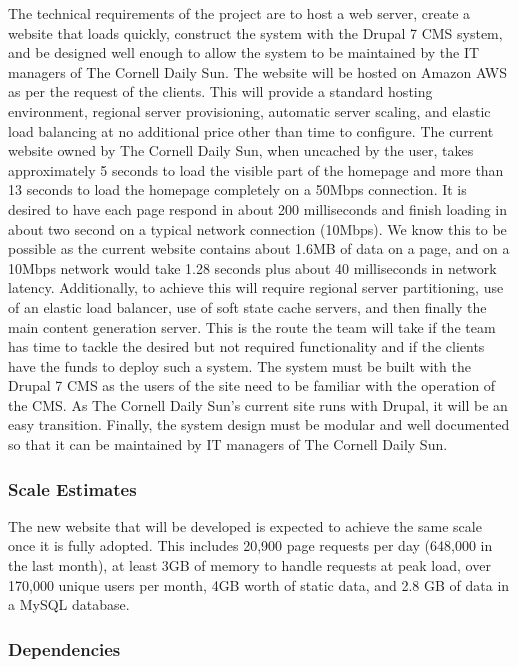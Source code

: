 \documentclass[11pt]{article} %
\begin{document}
The technical requirements of the project are to host a web server, create a website that loads quickly, construct the system with the Drupal 7 CMS system, and be designed well enough to allow the system to be maintained by the IT managers of The Cornell Daily Sun. The website will be hosted on Amazon AWS as per the request of the clients. This will provide a standard hosting environment, regional server provisioning, automatic server scaling, and elastic load balancing at no additional price other than time to configure. The current website owned by The Cornell Daily Sun, when uncached by the user, takes approximately 5 seconds to load the visible part of the homepage and more than 13 seconds to load the homepage completely on a 50Mbps connection. It is desired to have each page respond in about 200 milliseconds and finish loading in about two second on a typical network connection (10Mbps). We know this to be possible as the current website contains about 1.6MB of data on a page, and on a 10Mbps network would take 1.28 seconds plus about 40 milliseconds in network latency. Additionally, to achieve this will require regional server partitioning, use of an elastic load balancer, use of soft state cache servers, and then finally the main content generation server. This is the route the team will take if the team has time to tackle the desired but not required functionality and if the clients have the funds to deploy such a system. The system must be built with the Drupal 7 CMS as the users of the site need to be familiar with the operation of the CMS. As The Cornell Daily Sun’s current site runs with Drupal, it will be an easy transition. Finally, the system design must be modular and well documented so that it can be maintained by IT managers of The Cornell Daily Sun.

\subsubsection{Scale Estimates}

The new website that will be developed is expected to achieve the same scale once it is fully adopted. This includes 20,900 page requests per day (648,000 in the last month), at least 3GB of memory to handle requests at peak load, over 170,000 unique users per month, 4GB worth of static data, and 2.8 GB of data in a MySQL database.

\subsubsection{Dependencies}
\end{document}
